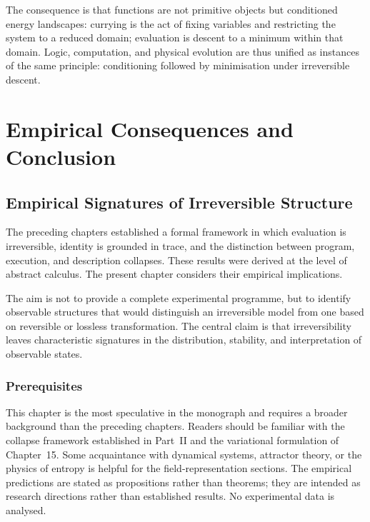 \documentclass[12pt, oneside]{amsbook}
\theoremstyle{plain}
\theoremstyle{definition}
\theoremstyle{remark}
\begin{document}
The consequence is that functions are not primitive objects but conditioned
energy landscapes: currying is the act of fixing variables and restricting the
system to a reduced domain; evaluation is descent to a minimum within that
domain. Logic, computation, and physical evolution are thus unified as
instances of the same principle: conditioning followed by minimisation under
irreversible descent.


\part{Empirical Consequences and Conclusion}

\chapter{Empirical Signatures of Irreversible Structure}
\label{ch:empirical}

The preceding chapters established a formal framework in which evaluation is
irreversible, identity is grounded in trace, and the distinction between
program, execution, and description collapses. These results were derived at
the level of abstract calculus. The present chapter considers their empirical
implications.

The aim is not to provide a complete experimental programme, but to identify
observable structures that would distinguish an irreversible model from one
based on reversible or lossless transformation. The central claim is that
irreversibility leaves characteristic signatures in the distribution,
stability, and interpretation of observable states.

\section{Prerequisites}

This chapter is the most speculative in the monograph and requires a broader background than the preceding chapters. Readers should be familiar with the collapse framework established in Part~II and the variational formulation of Chapter~15. Some acquaintance with dynamical systems, attractor theory, or the physics of entropy is helpful for the field-representation sections. The empirical predictions are stated as propositions rather than theorems; they are intended as research directions rather than established results. No experimental data is analysed.
\end{document}
